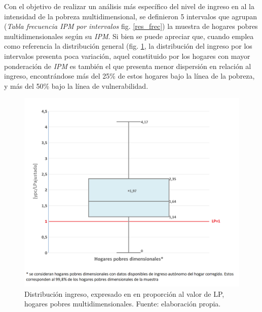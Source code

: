 \documentclass[12pt,letterpaper,spanish]{article}
\begin{document}






Con el objetivo de realizar un análisis más específico del nivel de ingreso en al la intensidad de la pobreza multidimensional, se definieron 5 intervalos que agrupan  (\textit{Tabla frecuencia IPM por intervalos} fig. \ref{res_frec}) la muestra de hogares pobres multidimensionales según su \textit{IPM}. Si bien se puede apreciar que, cuando emplea como referencia la distribución general (fig. \ref{box_general}, la distribución del ingreso por los intervalos presenta poca variación,  aquel constituido por los hogares con mayor ponderación de \textit{IPM}  es también el que presenta menor dispersión en relación al ingreso, encontrándose más del 25\% de estos hogares bajo la línea de la pobreza, y más del 50\% bajo la línea de vulnerabilidad. 

\begin{figure}[!]
    \centering
    \includegraphics[height=10 cm]{Max/box_general.png}
    \caption{Distribución ingreso, expresado en en proporción al valor de LP, hogares pobres multidimensionales. Fuente: elaboración propia.}
    \label{box_general}
\end{figure}
\end{document}
